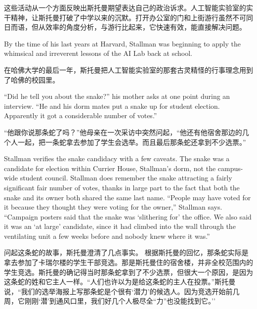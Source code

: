 \ifdefined\chs
这些活动从一个方面反映出斯托曼期望表达自己的政治诉求。人工智能实验室的实干精神，让斯托曼打破了中学以来的沉默。打开办公室的门和上街游行虽然不可同日而语，但从效率的角度分析，与游行比起来，它快速有效，能直接解决问题。
\fi

\ifdefined\eng
By the time of his last years at Harvard, Stallman was beginning to apply the whimsical and irreverent lessons of the AI Lab back at school.
\fi

\ifdefined\chs
在哈佛大学的最后一年，斯托曼把人工智能实验室的那套古灵精怪的行事理念用到了哈佛的校园里。
\fi

\ifdefined\eng
``Did he tell you about the snake?'' his mother asks at one point during an interview. ``He and his dorm mates put a snake up for student election. Apparently it got a considerable number of votes.''
\fi

\ifdefined\chs
``他跟你说那条蛇了吗？''他母亲在一次采访中突然问起，``他还有他宿舍那边的几个人一起，把一条蛇拿去参加了学生会选举。而且最后那条蛇还拿到不少选票。''
\fi

\ifdefined\eng
\ifdefined\vone
Stallman verifies the snake candidacy with a few caveats.
\fi
The snake was a candidate for election within Currier House, Stallman's dorm, not the campus-wide student council. Stallman does remember the snake attracting a \ifdefined\vone fairly significant \fi\ifdefined\vtwo fair \fi number of votes, thanks in large part to the fact that both the snake and its owner both shared the same last name. ``People may have voted for it because they thought they were voting for the owner,'' Stallman says. ``Campaign posters said that the snake was `slithering for' the office. We also said it was an `at large' candidate, since it had climbed into the wall through the ventilating unit a few weeks before and nobody knew where it was.''
\fi

\ifdefined\chs
\ifdefined\vone
问起这条蛇的故事，斯托曼澄清了几点事实。
\fi
根据斯托曼的回忆，那条蛇实际是拿去参加了卡瑞尔楼的学生干部竞选。那是斯托曼住的宿舍楼，并非全校范围内的学生竞选。斯托曼的确记得当时那条蛇拿到了不少选票，但很大一个原因，是因为这条蛇的姓和它主人一样。``人们也许以为是给这条蛇的主人在投票。''斯托曼说，``我们的选举海报上写那条蛇是个很有`潜力'的候选人。因为竞选开始前几周，它刚刚`潜'到通风口里，我们好几个人极尽全``力''也没能找到它。''
\fi

